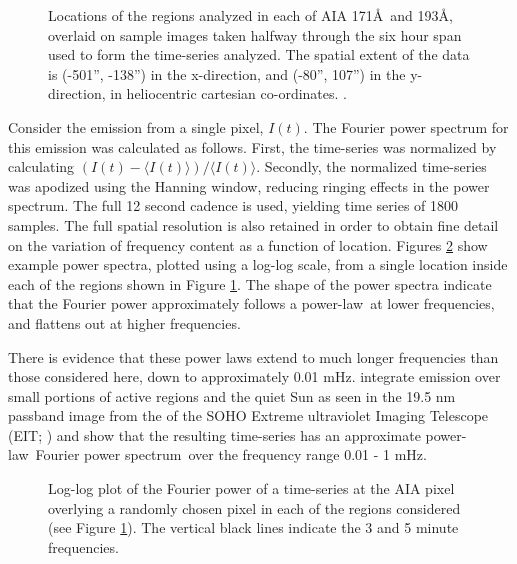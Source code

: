 \documentclass[onecolumn]{emulateapj}
\newcommand{\PS}{power spectrum}
\newcommand{\PL}{power-law}
\newcommand{\Fps}{Fourier \PS}
\begin{document}
\begin{figure}
\centerline{
}
\caption{Locations of the regions analyzed in each of AIA 171\AA\ and
  193\AA, overlaid on sample images taken halfway through the six hour
  span used to form the time-series analyzed.  The spatial extent of
  the data is (-501'', -138'') in the x-direction, and (-80'', 107'')
  in the y-direction, in heliocentric cartesian co-ordinates.
  \citep{2006A&A...449..791T}.}
\label{fig:loc171193}
\end{figure}

Consider the emission from a single pixel, $I(t)$.  The Fourier power
spectrum for this emission was calculated as follows.  First, the
time-series was normalized by calculating $(I(t) - \langle I(t)
\rangle)/\langle I(t) \rangle$. Secondly, the normalized time-series
was apodized using the Hanning window, reducing ringing effects in the
\PS.  The full 12 second cadence is used, yielding time series of 1800
samples.  The full spatial resolution is also retained in order to
obtain fine detail on the variation of frequency content as a function
of location.  Figures \ref{fig:compare171193} show example power
spectra, plotted using a log-log scale, from a single location inside
each of the regions shown in Figure \ref{fig:loc171193}.  The shape of
the power spectra indicate that the Fourier power approximately
follows a \PL\ at lower frequencies, and flattens out at higher
frequencies.

There is evidence that these power laws extend to much longer
frequencies than those considered here, down to approximately 0.01
mHz. \cite{2014AA...563A...8A} integrate emission over small portions
of active regions and the quiet Sun as seen in the 19.5 nm passband
image from the of the SOHO \cite{1995SoPh..162....1D} Extreme
ultraviolet Imaging Telescope (EIT; \cite{1995SoPh..162..291D}) and
show that the resulting time-series has an approximate \PL\ \Fps\ over
the frequency range 0.01 - 1 mHz.

\begin{figure}
\centerline{
}
\centerline{
}
\caption{Log-log plot of the Fourier power of a time-series at the AIA
  pixel overlying a randomly chosen pixel in each of the regions
  considered (see Figure \protect\ref{fig:loc171193}).  The vertical
  black lines indicate the 3 and 5 minute frequencies.}
\label{fig:compare171193}
\end{figure}
\end{document}
